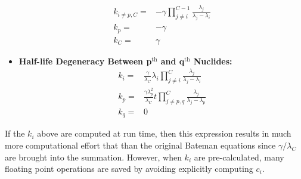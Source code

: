 \documentclass[letterpaper]{physor2018}
\newcommand{\pth}{p$^{\mathrm{th}}$\xspace}
\newcommand{\qth}{q$^{\mathrm{th}}$\xspace}
\begin{document}
\begin{itemize}
\begin{equation}
\label{k-last-unstable-p-almost-stable-1}
\begin{split}
    k_{i\ne p,C} = & -\gamma \prod_{j\ne i}^{C-1} \frac{\lambda_j}{\lambda_j - \lambda_i} \\
    k_p = & -\gamma \\
    k_C = & \gamma
\end{split}
\end{equation}
\item \textbf{Half-life Degeneracy Between \pth and \qth Nuclides:}
\begin{equation}
\label{k-degen-pq-0}
\begin{split}
    k_i = & \frac{\gamma}{\lambda_C} \lambda_i \prod_{j\ne i}^C \frac{\lambda_j}{\lambda_j - \lambda_i} \\
    k_p = & \frac{\gamma\lambda_p^2}{\lambda_C} t \prod_{j\ne p,q}^C \frac{\lambda_j}{\lambda_j - \lambda_p} \\
    k_q = & 0
\end{split}
\end{equation}
\end{itemize}
If the $k_i$ above are computed at run time, then this expression results in much more
computational effort that than the original Bateman equations since $\gamma/\lambda_C$
are brought into the summation. However, when $k_i$ are pre-calculated,
many floating point operations are saved by avoiding explicitly computing $c_i$.
\end{document}
